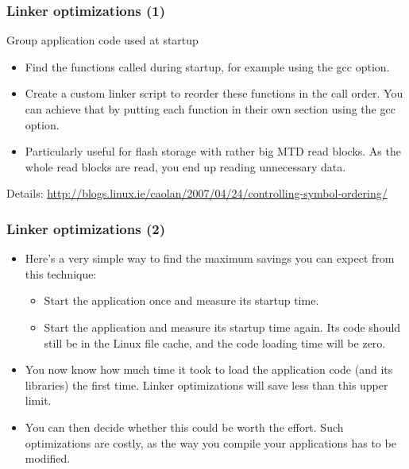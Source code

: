\begin{frame}
\frametitle{Linker optimizations (1)}
Group application code used at startup
\begin{itemize}
        \item Find the functions called during startup, for example using
              the  gcc option.
        \item Create a custom linker script to reorder these functions in
              the call order. You can achieve that by putting each function
              in their own section using the  gcc
              option.
        \item Particularly useful for flash storage with rather big MTD
              read blocks. As the whole read blocks are read, you end up
              reading unnecessary data.
\end{itemize}
Details:
{\scriptsize
\url{http://blogs.linux.ie/caolan/2007/04/24/controlling-symbol-ordering/}}
\end{frame}

\begin{frame}
\frametitle{Linker optimizations (2)}
\begin{itemize}
\item Here's a very simple way to find the maximum savings you can expect
      from this technique:
      \begin{itemize}
      \item Start the application once and measure its startup time.
      \item Start the application and measure its startup time again.
            Its code should still be in the Linux file cache,
            and the code loading time will be zero.
      \end{itemize}
\item You now know how much time it took to load the application code
      (and its libraries) the first time. Linker optimizations will
      save less than this upper limit.
\item You can then decide whether this could be worth the effort.
      Such optimizations are costly, as the way you compile your
      applications has to be modified.
\end{itemize}
\end{frame}


